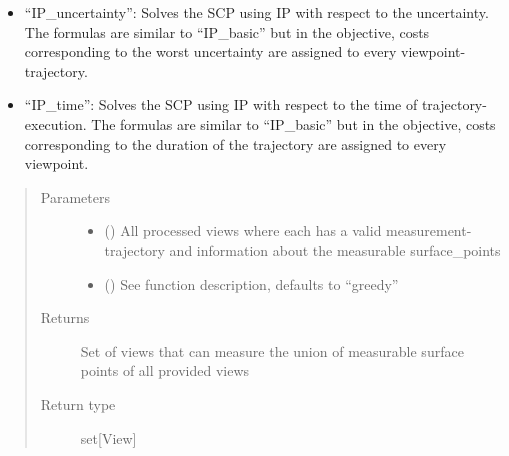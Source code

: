 \documentclass[letterpaper,10pt,english]{sphinxmanual}
\begin{document}
\begin{fulllineitems}
\begin{fulllineitems}
\begin{itemize}
\item {} 
“IP\_uncertainty”: Solves the SCP using IP with respect to the uncertainty. The formulas are similar to “IP\_basic”
but in the objective, costs corresponding to the worst uncertainty are assigned to every viewpoint-trajectory.

\item {} 
“IP\_time”: Solves the SCP using IP with respect to the time of trajectory-execution. The formulas are similar to “IP\_basic”
but in the objective, costs corresponding to the duration of the trajectory are assigned to every viewpoint.

\end{itemize}
\begin{quote}\begin{description}
\item[{Parameters}] \leavevmode\begin{itemize}
\item {} 
 (\sphinxstyleliteralemphasis{{[}}\sphinxstyleliteralemphasis{{]} or }\sphinxstyleliteralemphasis{{[}}\sphinxstyleliteralemphasis{{]}}) \textendash{} All processed views where each has a valid measurement-trajectory and information about the measurable surface\_points

\item {} 
 (\sphinxstyleliteralemphasis{, }) \textendash{} See function description, defaults to “greedy”

\end{itemize}

\item[{Returns}] \leavevmode
Set of views that can measure the union of measurable surface points of all provided views

\item[{Return type}] \leavevmode
set{[}View{]}

\end{description}\end{quote}

\end{fulllineitems}



\end{fulllineitems}
\end{document}

